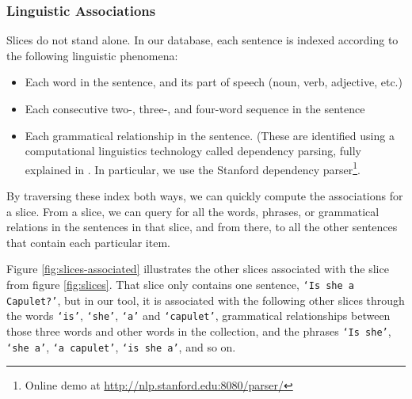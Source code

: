 \documentclass{sig-alternate}
\newcommand{\code}[1] {\texttt{#1}}
\begin{document}
\subsubsection{Linguistic Associations}
Slices do not stand alone. In our database, each sentence is indexed according to the following linguistic phenomena:
\begin{itemize}
  \item Each word in the sentence, and its part of speech (noun, verb, adjective, etc.)
  \item Each consecutive two-, three-, and four-word sequence in the sentence
  \item Each grammatical relationship in the sentence. (These are identified using a computational linguistics technology called dependency parsing, fully explained in \cite{jurafsky_chapter_2009}. In particular, we use the Stanford dependency parser\footnote{Online demo  at \url{http://nlp.stanford.edu:8080/parser/}}\cite{klein_accurate_2003}.
\end{itemize}
By traversing these index both ways, we can quickly compute the associations for a slice. From a slice, we can query for all the words, phrases, or grammatical relations in the sentences in that slice, and from there, to all the other sentences that contain each particular item.

Figure \ref{fig:slices-associated} illustrates the other slices associated with the slice from figure \ref{fig:slices}. That slice only contains one sentence, \code{`Is she a Capulet?'}, but in our tool, it is associated with the following other slices through the words \code{`is'}, \code{`she'}, \code{`a'} and \code{`capulet'}, grammatical relationships between those three words and other words in the collection, and the phrases \code{`Is she'}, \code{`she a'}, \code{`a capulet'},  \code{`is she a'}, and so on.
\end{document}
